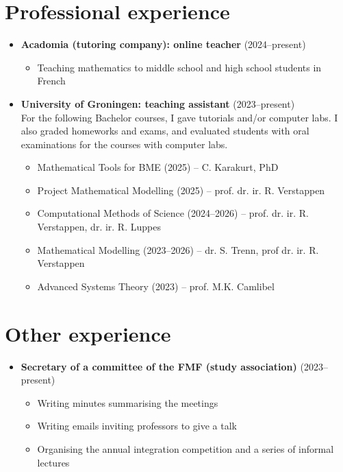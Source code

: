 \documentclass[10pt]{article}
\begin{document}
\section*{Professional experience}
\begin{itemize}
\item \textbf{Acadomia (tutoring company): online teacher} (2024--present)
\begin{itemize}
    \item Teaching mathematics to middle school and high school students in French
\end{itemize}
\item \textbf{University of Groningen: teaching assistant} (2023--present)\\ 
    For the following Bachelor courses, I gave tutorials and/or computer labs. I
    also graded homeworks and exams, and evaluated students
    with oral examinations for the courses with computer labs. \begin{itemize}
    \item Mathematical Tools for BME (2025) -- C. Karakurt, PhD
    \item Project Mathematical Modelling (2025) -- prof. dr. ir. R. Verstappen
    \item Computational Methods of Science (2024--2026) -- prof. dr. ir. R. Verstappen, dr. ir. R. Luppes
    \item Mathematical Modelling (2023--2026) -- dr. S. Trenn, prof dr. ir. R. Verstappen
    \item Advanced Systems Theory (2023) -- prof. M.K. Camlibel
\end{itemize}
\end{itemize}


\section*{Other experience}
\begin{itemize}
    \item \textbf{Secretary of a committee of the FMF (study association)} (2023--present)\begin{itemize}
    \item Writing minutes summarising the meetings 
    \item Writing emails inviting professors to give a talk 
    \item Organising the annual integration competition and a series of informal lectures
\end{itemize}
\end{itemize}
\end{document}
